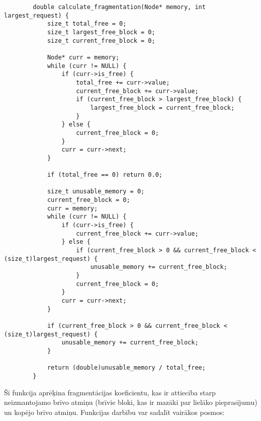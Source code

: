 \documentclass{report}
\begin{document}
	\begin{verbatim}
		double calculate_fragmentation(Node* memory, int largest_request) {
			size_t total_free = 0;
			size_t largest_free_block = 0;
			size_t current_free_block = 0;
			
			Node* curr = memory;
			while (curr != NULL) {
				if (curr->is_free) {
					total_free += curr->value;
					current_free_block += curr->value;
					if (current_free_block > largest_free_block) {
						largest_free_block = current_free_block;
					}
				} else {
					current_free_block = 0;
				}
				curr = curr->next;
			}
			
			if (total_free == 0) return 0.0;
			
			size_t unusable_memory = 0;
			current_free_block = 0;
			curr = memory;
			while (curr != NULL) {
				if (curr->is_free) {
					current_free_block += curr->value;
				} else {
					if (current_free_block > 0 && current_free_block < (size_t)largest_request) {
						unusable_memory += current_free_block;
					}
					current_free_block = 0;
				}
				curr = curr->next;
			}
			
			if (current_free_block > 0 && current_free_block < (size_t)largest_request) {
				unusable_memory += current_free_block;
			}
			
			return (double)unusable_memory / total_free;
		}
	\end{verbatim}
	
	Šī funkcija aprēķina fragmentācijas koeficientu, kas ir attiecība starp neizmantojamo brīvo atmiņu (brīvie bloki, kas ir mazāki par lielāko pieprasījumu) un kopējo brīvo atmiņu. Funkcijas darbību var sadalīt vairākos posmos:
	
\end{document}
